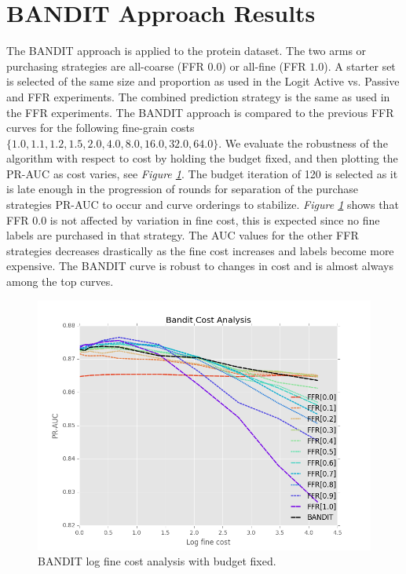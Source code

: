 \documentclass[ms]{nuthesis}
\begin{document}

\section{BANDIT Approach Results}
\label{sect:BANDITResults}
The BANDIT approach is applied to the protein dataset. The two arms or purchasing
strategies are all-coarse (FFR $0.0$) or all-fine (FFR $1.0$). A starter set is selected
of the same size and proportion as used in the Logit Active vs. Passive and FFR experiments.
The combined prediction strategy is the same as used in the FFR experiments. The BANDIT approach is
compared to the previous FFR curves for the following fine-grain costs
$\{1.0, 1.1, 1.2, 1.5, 2.0, 4.0, 8.0, 16.0, 32.0, 64.0\}$. We evaluate
the robustness of the algorithm with respect to cost by holding the budget fixed, and then
plotting the PR-AUC as cost varies, see \textit{Figure \ref{fig:BanditPlotLogFine}}.
The budget iteration of 120 is selected as it is late enough in the
progression of rounds for separation of the purchase strategies PR-AUC to occur and curve
orderings to stabilize. \textit{Figure \ref{fig:BanditPlotLogFine}} shows that FFR $0.0$ is not
 affected by variation in fine cost, this is expected since no fine labels are purchased
 in that strategy. The AUC values for the other FFR strategies decreases drastically as
 the fine cost increases and labels become more expensive. The BANDIT curve is robust to
 changes in cost and is almost always among the top curves.

\FloatBarrier
\begin{figure}[!htb]
	\centering
    \includegraphics[width=1.0\columnwidth]{fig/BanditPlotLogFine}
    \caption{BANDIT log fine cost analysis with budget fixed.}
    \label{fig:BanditPlotLogFine}
\end{figure}
\FloatBarrier
\end{document}
